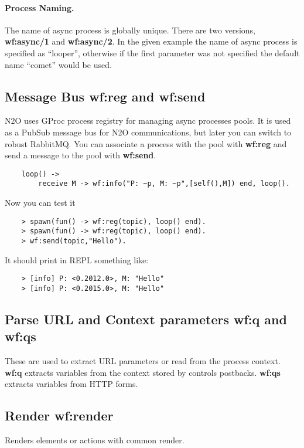 \paragraph{\bf Process Naming.} The name of async process is globally unique. There are two
versions, {\bf wf:async/1} and {\bf wf:async/2}. In the given example
the name of async process is specified as ``looper'', otherwise
if the first parameter was not specified the default name ``comet'' would be used.

\subsection{Message Bus {\bf wf:reg} and {\bf wf:send}}
N2O uses GProc process registry for managing async processes pools.
It is used as a PubSub message bus for N2O communications, but later you can switch to robust RabbitMQ.
You can associate a process with the pool with {\bf wf:reg} and send a message to the pool with {\bf wf:send}.

\vspace{1\baselineskip}
\begin{lstlisting}
    loop() ->
        receive M -> wf:info("P: ~p, M: ~p",[self(),M]) end, loop().
\end{lstlisting}

Now you can test it

\begin{lstlisting}
    > spawn(fun() -> wf:reg(topic), loop() end).
    > spawn(fun() -> wf:reg(topic), loop() end).
    > wf:send(topic,"Hello").
\end{lstlisting}

It should print in REPL something like:

\begin{lstlisting}
    > [info] P: <0.2012.0>, M: "Hello"
    > [info] P: <0.2015.0>, M: "Hello"
\end{lstlisting}

\subsection{Parse URL and Context parameters {\bf wf:q} and {\bf wf:qs}}
These are used to extract URL parameters or read from the process context. {\bf wf:q} extracts variables
from the context stored by controls postbacks. {\bf wf:qs} extracts variables from HTTP forms.

\subsection{Render {\bf wf:render}}
Renders elements or actions with common render.

